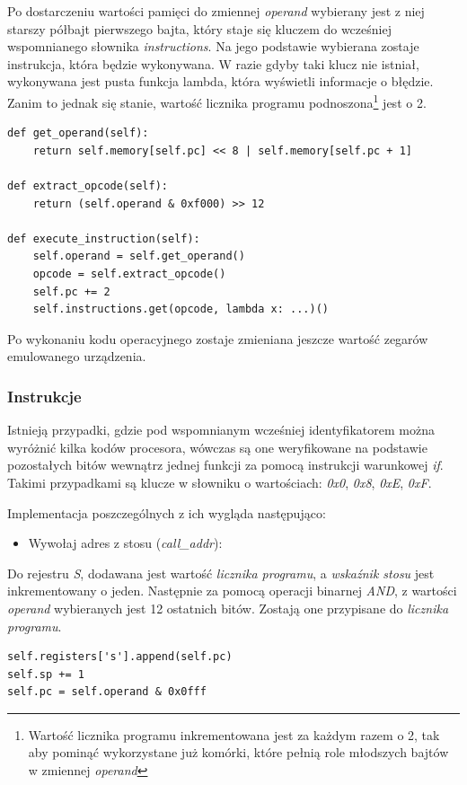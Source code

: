 Po dostarczeniu wartości pamięci do zmiennej \textit{operand} wybierany jest z niej starszy półbajt pierwszego bajta, który staje się kluczem do wcześniej wspomnianego słownika \textit{instructions}. Na jego podstawie wybierana zostaje instrukcja, która będzie wykonywana. W razie gdyby taki klucz nie istniał, wykonywana jest pusta funkcja lambda, która wyświetli informacje o błędzie. Zanim to jednak się stanie, wartość licznika programu podnoszona\footnote{Wartość licznika programu inkrementowana jest za każdym razem o 2, tak aby pominąć wykorzystane już komórki, które pełnią role młodszych bajtów w zmiennej \textit{operand}} jest o 2. 

\begin{lstlisting}[caption={Framgent kodu, służący do wywoływania instrukcji procesora.},captionpos=b]
def get_operand(self):
    return self.memory[self.pc] << 8 | self.memory[self.pc + 1]

def extract_opcode(self):
    return (self.operand & 0xf000) >> 12

def execute_instruction(self):
    self.operand = self.get_operand()
    opcode = self.extract_opcode()
    self.pc += 2
    self.instructions.get(opcode, lambda x: ...)()
\end{lstlisting}

Po wykonaniu kodu operacyjnego zostaje zmieniana jeszcze wartość zegarów emulowanego urządzenia.
\subsubsection{Instrukcje}
Istnieją przypadki, gdzie pod wspomnianym wcześniej identyfikatorem można wyróżnić kilka kodów procesora, wówczas są one weryfikowane na podstawie pozostałych bitów wewnątrz jednej funkcji za pomocą instrukcji warunkowej \textit{if}. Takimi przypadkami są klucze w słowniku o wartościach: \textit{0x0}, \textit{0x8}, \textit{0xE}, \textit{0xF}.

Implementacja poszczególnych z ich wygląda następująco:

\begin{itemize}
  \item Wywołaj adres z stosu (\textit{call\_addr}):
\end{itemize}
Do rejestru \textit{S}, dodawana jest wartość \textit{licznika programu}, a \textit{wskaźnik stosu} jest inkrementowany o jeden. Następnie za pomocą operacji binarnej \textit{AND}, z wartości \textit{operand} wybieranych jest 12 ostatnich bitów. Zostają one przypisane do \textit{licznika programu}.
\begin{lstlisting}[caption={Framgent kodu, odpowiedzialny za instrukcje \textit{call\_addr}},captionpos=b]
self.registers['s'].append(self.pc)
self.sp += 1
self.pc = self.operand & 0x0fff
\end{lstlisting}

